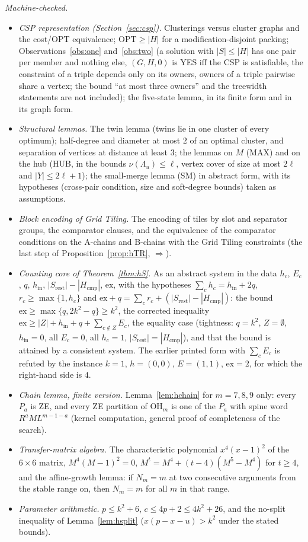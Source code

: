 \emph{Machine-checked.}
\begin{itemize}
\item \emph{CSP representation (Section~\ref{sec:csp}).} Clusterings versus cluster graphs and the cost/OPT equivalence; $\mathrm{OPT}\ge|H|$ for a modification-disjoint packing; Observations~\ref{obs:one} and~\ref{obs:two} (a solution with $|S|\le|H|$ has one pair per member and nothing else, $(G,H,0)$ is YES iff the CSP is satisfiable, the constraint of a triple depends only on its owners, owners of a triple pairwise share a vertex; the bound ``at most three owners'' and the treewidth statements are not included); the five-state lemma, in its finite form and in its graph form.
\item \emph{Structural lemmas.} The twin lemma (twins lie in one cluster of every optimum); half-degree and diameter at most $2$ of an optimal cluster, and separation of vertices at distance at least $3$; the lemmas on $M$ (MAX) and on the hub (HUB, in the bounds $\nu(\Lambda_u)\le\ell$, vertex cover of size at most $2\ell$ and $|Y|\le2\ell+1$); the small-merge lemma (SM) in abstract form, with its hypotheses (cross-pair condition, size and soft-degree bounds) taken as assumptions.
\item \emph{Block encoding of Grid Tiling.} The encoding of tiles by slot and separator groups, the comparator clauses, and the equivalence of the comparator conditions on the A-chains and B-chains with the Grid Tiling constraints (the last step of Proposition~\ref{prop:hTR}, $\Rightarrow$).
\item \emph{Counting core of Theorem~\ref{thm:hS}.} As an abstract system in the data $h_c$, $E_c$, $q$, $h_{\mathrm{in}}$, $|S_{\mathrm{rest}}|-|H_{\mathrm{cmp}}|$, $\mathrm{ex}$, with the hypotheses $\sum_ch_c=h_{\mathrm{in}}+2q$, $r_c\ge\max\{1,h_c\}$ and $\mathrm{ex}+q=\sum_cr_c+(|S_{\mathrm{rest}}|-|H_{\mathrm{cmp}}|)$: the bound $\mathrm{ex}\ge\max\{q,2k^2-q\}\ge k^2$, the corrected inequality $\mathrm{ex}\ge|Z|+h_{\mathrm{in}}+q+\sum_{c\notin Z}E_c$, the equality case (tightness: $q=k^2$, $Z=\emptyset$, $h_{\mathrm{in}}=0$, all $E_c=0$, all $h_c=1$, $|S_{\mathrm{rest}}|=|H_{\mathrm{cmp}}|$), and that the bound is attained by a consistent system. The earlier printed form with $\sum_cE_c$ is refuted by the instance $k=1$, $h=(0,0)$, $E=(1,1)$, $\mathrm{ex}=2$, for which the right-hand side is $4$.
\item \emph{Chain lemma, finite version.} Lemma~\ref{lem:hchain} for $m=7,8,9$ only: every $P_a$ is ZE, and every ZE partition of $\mathrm{OH}_m$ is one of the $P_a$ with spine word $R^aML^{m-1-a}$ (kernel computation, general proof of completeness of the search).
\item \emph{Transfer-matrix algebra.} The characteristic polynomial $x^4(x-1)^2$ of the $6\times6$ matrix, $M^4(M-1)^2=0$, $M^t=M^4+(t-4)(M^5-M^4)$ for $t\ge4$, and the affine-growth lemma: if $N_m=m$ at two consecutive arguments from the stable range on, then $N_m=m$ for all $m$ in that range.
\item \emph{Parameter arithmetic.} $p\le k^2+6$, $c\le4p+2\le4k^2+26$, and the no-split inequality of Lemma~\ref{lem:hsplit} ($x(p-x-u)>k^2$ under the stated bounds).
\end{itemize}

